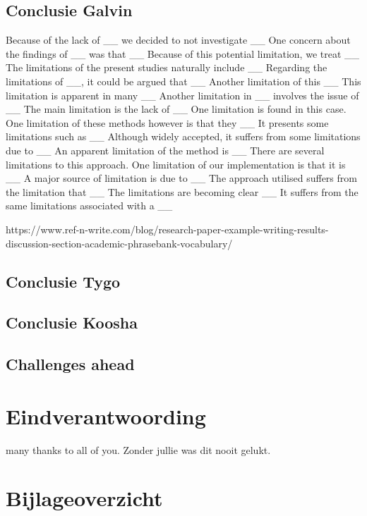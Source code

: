 \documentclass{article}
\begin{document}
		
		\subsection{Conclusie Galvin}
		
		Because of the lack of __ we decided to not investigate __
		One concern about the findings of __ was that __
		Because of this potential limitation, we treat __
		The limitations of the present studies naturally include __
		Regarding the limitations of __, it could be argued that __
		Another limitation of this __
		This limitation is apparent in many __
		Another limitation in __ involves the issue of __
		The main limitation is the lack of __
		One limitation is found in this case.
		One limitation of these methods however is that they __
		It presents some limitations such as __
		Although widely accepted, it suffers from some limitations due to __
		An apparent limitation of the method is __
		There are several limitations to this approach.
		One limitation of our implementation is that it is __
		A major source of limitation is due to  __
		The approach utilised suffers from the limitation that __
		The limitations are becoming clear __
		It suffers from the same limitations associated with a __
		
		https://www.ref-n-write.com/blog/research-paper-example-writing-results-discussion-section-academic-phrasebank-vocabulary/
		
		\subsection{Conclusie Tygo}
		
		\subsection{Conclusie Koosha}
		
		\subsection{Challenges ahead}
		
		
		
			\newpage
		\section{Eindverantwoording}
		many thanks to all of you. Zonder jullie was dit nooit gelukt.
		
		\section{Bijlageoverzicht}
		
\end{document}
